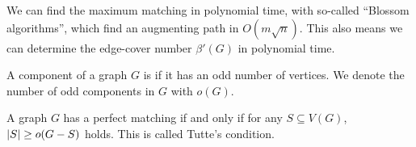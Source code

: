 
We can find the maximum matching in polynomial time, with so-called
\enquote{Blossom algorithms}, which find an augmenting path in $O(m \sqrt{n})$.
This also means we can determine the edge-cover number $\beta'(G)$ in polynomial
time.


\begin{definition}
  A component of a graph $G$ is  if it has an odd number of vertices.
  We denote the number of odd components in $G$ with $o(G)$.
\end{definition}

\begin{theorem}[Tutte]
  A graph $G$ has a perfect matching if and only if for any $S \subseteq V(G)$,
  $\left| S \right| \ge o(G - S)$ holds.
  This is called Tutte's condition.
\end{theorem}

